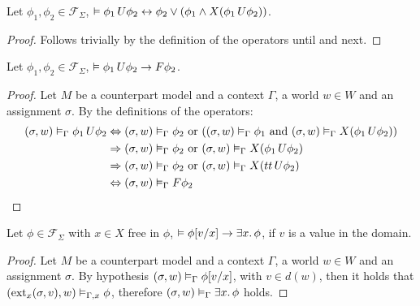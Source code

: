 \begin{lemma}\label{lem:untilexp}
  Let $\phi_1, \phi_2 \in \mathcal{F}_\Sigma$, $\vDash {\phi_1}\,U {\phi_2} \leftrightarrow \phi_2 \lor (\phi_1 \land
  X{({\phi_1}\,U {\phi_2})})$.
\end{lemma}
\begin{proof}
  Follows trivially by the definition of the operators until and next.
\end{proof}

\begin{lemma}\label{lem:untileventually}
  Let $\phi_1, \phi_2 \in \mathcal{F}_\Sigma$, $\vDash {\phi_1}\,U {\phi_2} \to F{\phi_2}$.
\end{lemma}
\begin{proof}
  Let $M$ be a counterpart model and a context $\Gamma$, a world $w \in W$ and an assignment $\sigma$.
  By the definitions of the operators:
  \[
    \begin{split}
      ({\sigma}, {w}) \vDash_{\Gamma} {{\phi_1}\,U {\phi_2}}
      &\Leftrightarrow ({\sigma}, {w}) \vDash_{\Gamma} {\phi_2} \text{ or } (({\sigma}, {w}) \vDash_{\Gamma} {\phi_1} \text{ and }
          ({\sigma}, {w}) \vDash_{\Gamma} {X{({\phi_1}\,U {\phi_2})}}) \\
      &\Rightarrow ({\sigma}, {w}) \vDash_{\Gamma} {\phi_2} \text{ or } ({\sigma}, {w}) \vDash_{\Gamma} {X{({\phi_1}\,U {\phi_2})}} \\
      &\Rightarrow ({\sigma}, {w}) \vDash_{\Gamma} {\phi_2} \text{ or } ({\sigma}, {w}) \vDash_{\Gamma} {X{({tt}\,U {\phi_2})}} \\
      &\Leftrightarrow ({\sigma}, {w}) \vDash_{\Gamma} {F{\phi_2}}
    \end{split}
  \]
\end{proof}

\begin{lemma}\label{lem:exintro}
  Let $\phi \in \mathcal{F}_\Sigma$ with $x \in X$ free in $\phi$, $\vDash \phi[v/x] \to \exists {x} \ldotp {\phi}$, if $v$ is a
  value in the domain.
\end{lemma}
\begin{proof}
  Let $M$ be a counterpart model and a context $\Gamma$, a world $w \in W$ and an assignment $\sigma$.
  By hypothesis $({\sigma}, {w}) \vDash_{\Gamma} {\phi[v/x]}$, with $v \in d(w)$, then it holds that
  $({\text{ext}_{x}({\sigma},{v})}, {w}) \vDash_{\Gamma,x} {\phi}$, therefore $({\sigma}, {w}) \vDash_{\Gamma} {\exists {x} \ldotp {\phi}}$ holds.
\end{proof}

